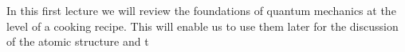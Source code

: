 In this first lecture we will review the foundations of quantum mechanics at the level of a cooking recipe. This will enable us to use them later for the discussion of the atomic structure and t